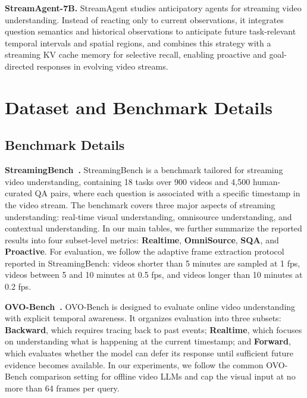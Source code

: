 \documentclass{article}
\begin{document}
\noindent\textbf{StreamAgent-7B\cite{DBLP:journals/corr/abs-2508-01875}.}
StreamAgent studies anticipatory agents for streaming video understanding. Instead of reacting only to current observations, it integrates question semantics and historical observations to anticipate future task-relevant temporal intervals and spatial regions, and combines this strategy with a streaming KV cache memory for selective recall, enabling proactive and goal-directed responses in evolving video streams.

\section{Dataset and Benchmark Details}
\label{app:data}

\subsection{Benchmark Details}
\label{app:benchmark-details}

\noindent\textbf{StreamingBench~\cite{lin2024streamingbenchassessinggapmllms}.}
StreamingBench is a benchmark tailored for streaming video understanding, containing 18 tasks over 900 videos and 4,500 human-curated QA pairs, where each question is associated with a specific timestamp in the video stream. The benchmark covers three major aspects of streaming understanding: real-time visual understanding, omnisource understanding, and contextual understanding. In our main tables, we further summarize the reported results into four subset-level metrics: \textbf{Realtime}, \textbf{OmniSource}, \textbf{SQA}, and \textbf{Proactive}. For evaluation, we follow the adaptive frame extraction protocol reported in StreamingBench: videos shorter than 5 minutes are sampled at 1 fps, videos between 5 and 10 minutes at 0.5 fps, and videos longer than 10 minutes at 0.2 fps.

\noindent\textbf{OVO-Bench~\cite{DBLP:conf/cvpr/NiuLMGZHDDD0ZZC25}.}
OVO-Bench is designed to evaluate online video understanding with explicit temporal awareness. It organizes evaluation into three subsets: \textbf{Backward}, which requires tracing back to past events; \textbf{Realtime}, which focuses on understanding what is happening at the current timestamp; and \textbf{Forward}, which evaluates whether the model can defer its response until sufficient future evidence becomes available. In our experiments, we follow the common OVO-Bench comparison setting for offline video LLMs and cap the visual input at no more than 64 frames per query.
\end{document}
